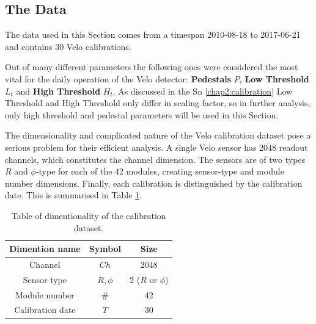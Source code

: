\subsection{The Data}

The data used in this Section comes from a timespan 2010-08-18 to 2017-06-21 and contains 30 Velo calibrations.

Out of many different parameters the following ones were considered the most vital for the daily operation of the Velo detector:
\textbf{Pedestals} $P$, \textbf{Low Threshold} $L_t$ and \textbf{High Threshold} $H_t$.
As discussed in the Sn \ref{chap2:calibration}
Low Threshold and High Threshold only differ in scaling factor, so in further analysis, only high threshold and pedestal parameters will be used in this Section.


The dimensionality and complicated nature of the Velo calibration dataset pose a serious problem for their efficient analysis.
A single Velo sensor has 2048 readout channels, which constitutes the channel dimension. The sensors are of two types $R$ and $\phi$-type for each of the 42 modules, creating sensor-type and module number dimensions. Finally, each calibration is distinguished by the calibration date. This is summarised in Table \ref{tab:velo_dimentionality}.

\begin{table}[h]
\begin{center}
\begin{tabular}{ |c|c|c| }
\hline
Dimention name & Symbol & Size\\
\hline
Channel & $Ch$ & 2048\\
Sensor type & ${R, \phi}$ & 2 ($R$ or $\phi$) \\
Module number & $\#$ & 42 \\
Calibration date & $T$ & 30\\
\hline
\end{tabular}
\caption{\label{tab:velo_dimentionality}Table of dimentionality of the calibration dataset.}
\end{center}
\end{table}

